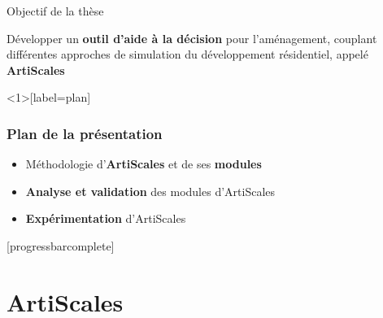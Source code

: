 \documentclass[xcolor=table]{beamer}
\begin{document}
\begin{frame}{Objectif de la thèse}
	\begin{block}{}
		Développer un \textbf{outil d'aide à la décision} pour l'aménagement, couplant différentes approches de simulation du développement résidentiel, appelé \textbf{ArtiScales}
	\end{block}
\end{frame}




\begin{frame}<1>[label=plan]
\frametitle{Plan de la présentation}
	\begin{itemize}
		\item \alert<1>{Méthodologie d'\textbf{ArtiScales} et de ses \textbf{modules}}
		\item \alert<2>{\textbf{Analyse et validation} des modules d'ArtiScales}
		\item \alert<3>{\textbf{Expérimentation} d'ArtiScales}
	\end{itemize}
\end{frame}
{}
[progressbarcomplete]

\section{ArtiScales}
\end{document}
